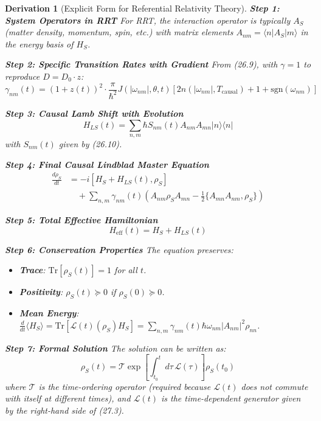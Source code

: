 \documentclass[10pt, a4paper]{article}
\newcommand{\Tr}{\text{Tr}}
\newtheorem{derivation}{Derivation}
\begin{document}
\begin{derivation}[Explicit Form for Referential Relativity Theory]
\textbf{Step 1: System Operators in RRT}
For RRT, the interaction operator is typically $A_S$ (matter density, momentum, spin, etc.) with matrix elements $A_{nm} = \langle n|A_S|m\rangle$ in the energy basis of $H_S$.

\textbf{Step 2: Specific Transition Rates with Gradient}
From (26.9), with $\gamma=1$ to reproduce $D = D_0 \cdot z$:
\begin{equation}
\gamma_{nm}(t) = (1+z(t))^{2} \cdot \frac{\pi}{\hbar^2} J(|\omega_{nm}|, \theta, t) [2n(|\omega_{nm}|, T_{\text{causal}}) + 1 + \text{sgn}(\omega_{nm})]
\tag{27.1}
\end{equation}

\textbf{Step 3: Causal Lamb Shift with Evolution}
\begin{equation}
H_{LS}(t) = \sum_{n,m} \hbar S_{nm}(t) A_{nm} A_{mn} |n\rangle\langle n|
\tag{27.2}
\end{equation}
with $S_{nm}(t)$ given by (26.10).

\textbf{Step 4: Final Causal Lindblad Master Equation}
\begin{align}
\frac{d\rho_S}{dt} &= -i[H_S + H_{LS}(t), \rho_S] \\
&\quad + \sum_{n,m} \gamma_{nm}(t) \left( A_{nm} \rho_S A_{mn} - \frac{1}{2} \{ A_{mn} A_{nm}, \rho_S \} \right)
\tag{27.3}
\end{align}

\textbf{Step 5: Total Effective Hamiltonian}
\begin{equation}
H_{\text{eff}}(t) = H_S + H_{LS}(t)
\tag{27.4}
\end{equation}

\textbf{Step 6: Conservation Properties}
The equation preserves:
\begin{itemize}
\item \textbf{Trace}: $\Tr[\rho_S(t)] = 1$ for all $t$.
\item \textbf{Positivity}: $\rho_S(t) \succeq 0$ if $\rho_S(0) \succeq 0$.
\item \textbf{Mean Energy}: $\frac{d}{dt}\langle H_S \rangle = \Tr[\mathcal{L}(t)(\rho_S) H_S] = \sum_{n,m} \gamma_{nm}(t) \hbar\omega_{nm} |A_{nm}|^2 \rho_{nn}$.
\end{itemize}

\textbf{Step 7: Formal Solution}
The solution can be written as:
\begin{equation}
\rho_S(t) = \mathcal{T} \exp\left[ \int_{t_0}^t d\tau \, \mathcal{L}(\tau) \right] \rho_S(t_0)
\tag{27.5}
\end{equation}
where $\mathcal{T}$ is the time-ordering operator (required because $\mathcal{L}(t)$ does not commute with itself at different times), and $\mathcal{L}(t)$ is the time-dependent generator given by the right-hand side of (27.3).


\end{derivation}
\end{document}
